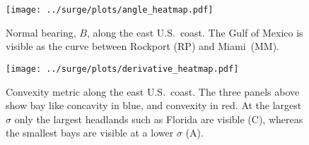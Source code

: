 


\begin{figure}[htb!]
\centering
\texttt{[image: ../surge/plots/angle\_heatmap.pdf]}
\caption{Normal bearing, $B$, along the east U.S.~coast.
         The Gulf of Mexico is visible as the curve between Rockport (RP)
         and Miami~(MM).
         }
\label{fig:angle_heatmap}

\texttt{[image: ../surge/plots/derivative\_heatmap.pdf]}
\caption{Convexity metric along the east U.S.~coast.
         The three panels above show bay like concavity in blue, and convexity
         in red. At the largest $\sigma$ only the largest headlands such as
         Florida are visible (C), whereas the smallest bays are visible at a lower
        $\sigma$ (A).
}
\label{fig:derivative}
\end{figure}
